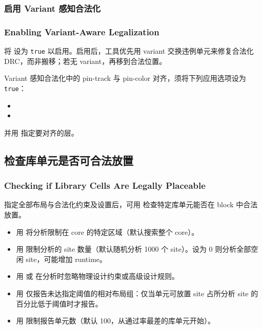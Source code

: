 \subsubsection{启用 Variant 感知合法化}
\subsubsection*{Enabling Variant-Aware Legalization}

将  设为 \texttt{true} 以启用。启用后，工具优先用 variant 交换违例单元来修复合法化 DRC，而非搬移；若无 variant，再移到合法位置。

Variant 感知合法化中的 pin-track 与 pin-color 对齐，须将下列应用选项设为 \texttt{true}：
\begin{itemize}
  \item {}
  \item {}
\end{itemize}
并用  指定要对齐的层。

\subsection{检查库单元是否可合法放置}
\subsubsection*{Checking if Library Cells Are Legally Placeable}

指定全部布局与合法化约束及设置后，可用  检查特定库单元能否在 block 中合法放置。
\begin{itemize}
  \item 用  将分析限制在 core 的特定区域（默认搜索整个 core）。
  \item 用  限制分析的 site 数量（默认随机分析 1000 个 site）。设为 0 则分析全部空闲 site，可能增加 runtime。
  \item 用  或  在分析时忽略物理设计约束或高级设计规则。
  \item 用  仅报告未达指定阈值的相对布局组：仅当单元可放置 site 占所分析 site 的百分比低于阈值时才报告。
  \item 用  限制报告单元数（默认 100，从通过率最差的库单元开始）。
\end{itemize}

